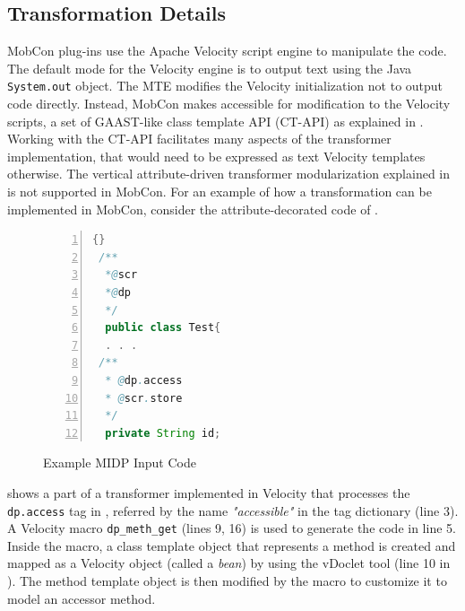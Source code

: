 \subsection{Transformation Details}

MobCon plug-ins use the Apache Velocity \cite{velocity} script engine to manipulate the code. The default mode for the Velocity engine is to output text using the Java \texttt{System.out} object. The MTE modifies the Velocity initialization not to output code directly. Instead, MobCon makes accessible for modification to the Velocity scripts, a set of GAAST-like class template API (CT-API) as explained in . Working with the CT-API facilitates many aspects of the transformer implementation, that would need to be expressed as text Velocity templates otherwise. The vertical attribute-driven transformer modularization explained in  is not supported in MobCon. For an example of how a transformation can be implemented in MobCon, consider the attribute-decorated code of .

\begin{figure}[ht]
	\begin{center}
	\begin{minipage}[t]{6cm}
		\begin{scriptsize}
		\begin{lstlisting}[numbers=left,language=Java,frame=leftline]{}
 /**
  *@scr
  *@dp
  */
  public class Test{
  . . .
 /**
  * @dp.access
  * @scr.store
  */
  private String id;
		\end{lstlisting}
		\end{scriptsize}
		\end{minipage}
	\end{center}
	\caption{Example MIDP Input Code}
	\label{fig:mc.code}
\end{figure}

 shows a part of a transformer implemented in Velocity that processes the \texttt{dp.access} tag in , referred by the name \textit{"accessible"} in the tag dictionary (line 3). A Velocity macro \texttt{dp\_\-meth\_\-get} (lines 9, 16) is used to generate the code in line 5. Inside the macro, a class template object that represents a method is created and mapped as a Velocity object (called a \textit{bean}) by using the vDoclet tool (line 10 in ). The method template object is then modified by the macro to customize it to model an accessor method. 

